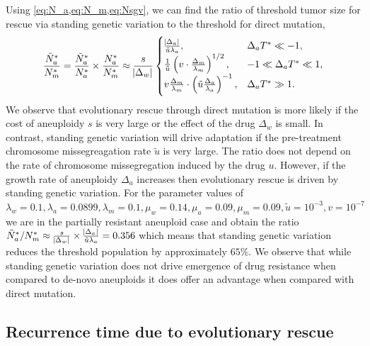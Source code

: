 \documentclass[12pt]{extarticle}
\begin{document}
Using \cref{eq:N_a,eq:N_m,eq:Nsgv}, we can find the ratio of threshold tumor size for rescue via standing genetic variation  to the threshold for direct mutation,
\begin{equation} \label{eq:N_sgv_ratio}
\frac{\tilde{N}^*_a}{N^*_m}=\frac{\tilde{N}^*_{a}}{N^*_{a}}\times\frac{N^*_a}{N^*_m} \approx \frac{s}{\abs{\Delta_w}}\begin{cases}
    \frac{\abs{\Delta_a}}{\tilde{u}\lambda_a} ,&
  \Delta_a T^* \ll -1 ,\\ 
  \frac{1}{\tilde{u}}\left(v \cdot \frac{\Delta_m}{\lambda_m}\right)^{1/2} ,&
  -1 \ll \Delta_a T^* \ll 1  ,\\ 
  v \frac{\Delta_m}{\lambda_m} \cdot \left(\tilde{u}\frac{\Delta_a}{\lambda_a}\right)^{-1}  ,&
   \Delta_a T^* \gg 1 .
  \end{cases}
\end{equation}
We observe that evolutionary rescue through direct mutation is more likely if the cost of aneuploidy $s$ is very large or the effect of the drug $\Delta_w$ is small.  In contrast, standing genetic variation will drive adaptation if the pre-treatment chromosome missegreagation rate $\tilde{u}$ is very large. The ratio does not depend on the rate of chromosome missegregation induced by the drug $u$. However, if the growth rate of aneuploidy $\Delta_a$ increases then evolutionary rescue is driven by standing genetic variation. For the parameter values of  $\lambda_w=0.1, \lambda_a=0.0899,\lambda_m=0.1,\mu_w=0.14,\mu_a=0.09,\mu_m=0.09, \tilde{u}=10^{-3}, v=10^{-7}$ we are in the partially resistant aneuploid case and obtain the ratio $\tilde{N}^*_a/N^*_m\approx\frac{s}{\abs{\Delta_w}}\times\frac{\abs{\Delta_a}}{\tilde{u}\lambda_a}=0.356$ which means that standing genetic variation reduces the threshold population by approximately $65\%$. We observe that while standing genetic variation does not drive emergence of drug resistance when compared to de-novo aneuploids it does offer an advantage when compared with direct mutation.


\subsection*{Recurrence time due to evolutionary rescue}
\end{document}
